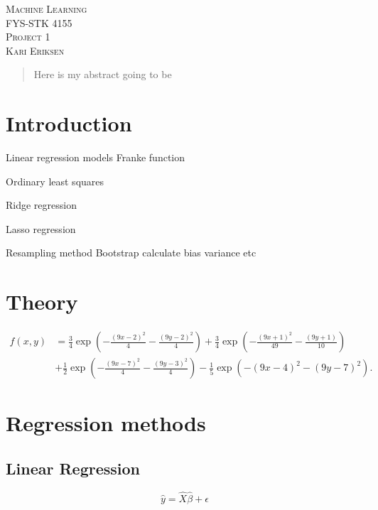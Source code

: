 \documentclass[a4paper,12pt, english]{article}
\begin{document}
\begin{titlepage}
\begin{center}
\textsc{\Large Machine Learning}\\[0.2cm]
\textsc{FYS-STK 4155}\\[1.0cm]
\textsc{\Large Project 1}\\[0.2cm]
\textsc{Kari Eriksen}\\[1.0cm]

\begin{abstract}
Here is my abstract going to be
\end{abstract}

\end{center}
\end{titlepage}

\section*{Introduction}



Linear regression models  Franke function

Ordinary least squares 

Ridge regression

Lasso regression

Resampling method Bootstrap calculate bias variance etc  

\section*{Theory}

\begin{align*}
f(x,y) &= \frac{3}{4}\exp{\left(-\frac{(9x-2)^2}{4} - \frac{(9y-2)^2}{4}\right)}+\frac{3}{4}\exp{\left(-\frac{(9x+1)^2}{49}- \frac{(9y+1)}{10}\right)} \\
&+\frac{1}{2}\exp{\left(-\frac{(9x-7)^2}{4} - \frac{(9y-3)^2}{4}\right)} -\frac{1}{5}\exp{\left(-(9x-4)^2 - (9y-7)^2\right) }.
\end{align*}


\section*{Regression methods}

\subsection*{Linear Regression}

\begin{equation}
\hat{y} = \hat{X} \hat{\beta} + \epsilon
\end{equation}
\end{document}
